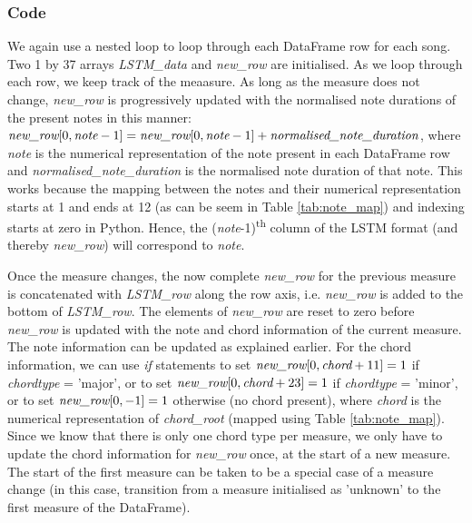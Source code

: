 \subsubsection{Code}
We again use a nested loop to loop through each DataFrame row for each song. Two 1 by 37 arrays \emph{LSTM\_data} and \emph{new\_row} are initialised. As we loop through each row, we keep track of the meaasure. As long as the measure does not change, \emph{new\_row} is progressively updated with the normalised note durations of the present notes in this manner: $\emph{new\_row}[0,\emph{note}-1] = \emph{new\_row}[0,\emph{note}-1] + \emph{normalised\_note\_duration}$, where \emph{note} is the numerical representation of the note present in each DataFrame row and \emph{normalised\_note\_duration} is the normalised note duration of that note. This works because the mapping between the notes and their numerical representation starts at 1 and ends at 12 (as can be seem in Table \ref{tab:note_map}) and indexing starts at zero in Python. Hence, the (\emph{note}-1)\textsuperscript{th} column of the LSTM format (and thereby \emph{new\_row}) will correspond to \emph{note}.

Once the measure changes, the now complete \emph{new\_row} for the previous measure is concatenated with \emph{LSTM\_row} along the row axis, i.e. \emph{new\_row} is added to the bottom of \emph{LSTM\_row}. The elements of \emph{new\_row} are reset to zero before \emph{new\_row} is updated with the note and chord information of the current measure. The note information can be updated as explained earlier. For the chord information, we can use \emph{if} statements to set $\emph{new\_row}[0, \emph{chord}+11] = 1$ if \emph{chordtype} = 'major', or to set $\emph{new\_row}[0, \emph{chord}+23] = 1$ if \emph{chordtype} = 'minor', or to set $\emph{new\_row}[0, -1] = 1$ otherwise (no chord present), where \emph{chord} is the numerical representation of \emph{chord\_root} (mapped using Table \ref{tab:note_map}). Since we know that there is only one chord type per measure, we only have to update the chord information for \emph{new\_row} once, at the start of a new measure. The start of the first measure can be taken to be a special case of a measure change (in this case, transition from a measure initialised as 'unknown' to the first measure of the DataFrame).

